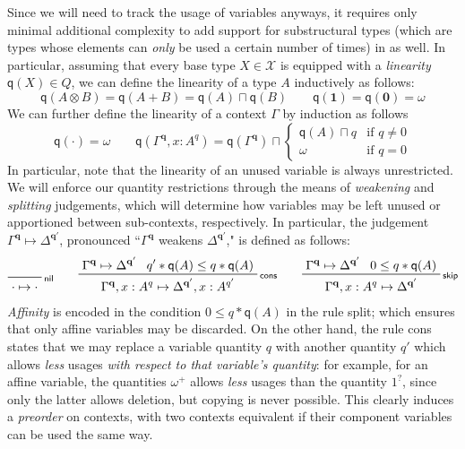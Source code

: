 \documentclass[acmsmall,screen,review]{acmart}
\newcommand{\mc}[1]{\ensuremath{\mathcal{#1}}}
\newcommand{\mb}[1]{\ensuremath{\mathbf{#1}}}
\newcommand{\ms}[1]{\ensuremath{\mathsf{#1}}}
\newcommand{\cwk}[2]{#1 \mapsto #2}
\newcommand{\rle}[1]{{\scriptsize\textsf{#1}}}
\newcommand{\brle}[1]{{\textsf{#1}}}
\newcommand{\zeroq}{0}
\newcommand{\delq}{1^?}
\newcommand{\cpyq}{\omega^+}
\newcommand{\topq}{\omega}
\newcommand{\alquant}{\ms{q}}
\begin{document}
Since we will need to track the usage of variables anyways, it requires only minimal additional
complexity to add support for substructural types (which are types whose elements can \emph{only} be used a
certain number of times) in as well. In particular, assuming that every base type $X \in \mc{X}$ is
equipped with a \emph{linearity} $\alquant(X) \in Q$, we can define the linearity of a type $A$
inductively as follows:
\begin{equation}
  \alquant(A \otimes B) = \alquant(A + B) = \alquant(A) \sqcap \alquant(B) \qquad
  \alquant(\mb{1}) = \alquant(\mb{0}) = \topq
\end{equation}
We can further define the linearity of a context $\Gamma$ by induction as follows
\begin{equation}
  \alquant(\cdot) = \topq \qquad
  \alquant(\Gamma^{\mb{q}}, x : A^q) 
    = \alquant(\Gamma^{\mb{q}}) \sqcap \begin{cases}
    \alquant(A) \sqcap q & \text{if } q \neq 0 \\
    \topq & \text{if } q = 0
  \end{cases}
\end{equation}
In particular, note that the linearity of an unused variable is always unrestricted.
%
We will enforce our quantity restrictions through the means of \emph{weakening} and \emph{splitting}
judgements, which will determine how variables may be left unused or apportioned between
sub-contexts, respectively. In particular, the judgement $\cwk{\Gamma^{\mb{q}}}{\Delta^{\mb{q}'}}$,
pronounced ``$\Gamma^{\mb{q}}$ weakens $\Delta^{\mb{q'}}$," is defined as follows:
\begin{gather*}
  \prftree[r]{\rle{nil}}{\cwk{\cdot}{\cdot}} \qquad 
  \prftree[r]{\rle{cons}}
    {\cwk{\Gamma^{\mb{q}}}{\Delta^{\mb{q}'}}}
    {q' * \alquant(A) \leq q * \alquant(A)}
    {\cwk{\Gamma^{\mb{q}}, x : A^q}
         {\Delta^{\mb{q}'}, x : A^{q'}}} \qquad
  \prftree[r]{\rle{skip}}
    {\cwk{\Gamma^{\mb{q}}}{\Delta^{\mb{q}'}}}
    {\zeroq \leq q * \alquant(A)}
    {\cwk{\Gamma^{\mb{q}}, x : A^q}{\Delta}^{\mb{q}'}}
\end{gather*}
\emph{Affinity} is encoded in the condition $\zeroq \leq q * \alquant(A)$ in the rule \brle{split};
which ensures that only affine variables may be discarded. On the other hand, the rule \brle{cons}
states that we may replace a variable quantity $q$ with another quantity $q'$ which allows
\emph{less} usages \emph{with respect to that variable's quantity}: for example, for an affine
variable, the quantities $\cpyq$ allows \emph{less} usages than the quantity $\delq$, since only the
latter allows deletion, but copying is never possible. This clearly induces a \emph{preorder} on
contexts, with two contexts equivalent if their component variables can be used the same way.
\end{document}
